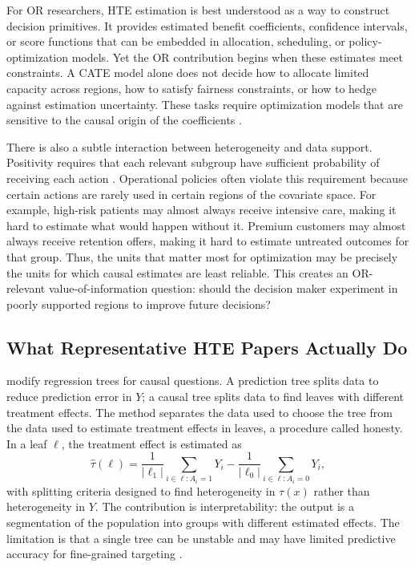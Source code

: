 \documentclass[11pt]{article}
\begin{document}
For OR researchers, HTE estimation is best understood as a way to construct decision primitives. It provides estimated benefit coefficients, confidence intervals, or score functions that can be embedded in allocation, scheduling, or policy-optimization models. Yet the OR contribution begins when these estimates meet constraints. A CATE model alone does not decide how to allocate limited capacity across regions, how to satisfy fairness constraints, or how to hedge against estimation uncertainty. These tasks require optimization models that are sensitive to the causal origin of the coefficients \citep{ben2009robust,athey2021policy}.

There is also a subtle interaction between heterogeneity and data support. Positivity requires that each relevant subgroup have sufficient probability of receiving each action \citep{imbens2015causal,hernan2020causal}. Operational policies often violate this requirement because certain actions are rarely used in certain regions of the covariate space. For example, high-risk patients may almost always receive intensive care, making it hard to estimate what would happen without it. Premium customers may almost always receive retention offers, making it hard to estimate untreated outcomes for that group. Thus, the units that matter most for optimization may be precisely the units for which causal estimates are least reliable. This creates an OR-relevant value-of-information question: should the decision maker experiment in poorly supported regions to improve future decisions?

\subsection{What Representative HTE Papers Actually Do}

\citet{athey2016recursive} modify regression trees for causal questions. A prediction tree splits data to reduce prediction error in $Y$; a causal tree splits data to find leaves with different treatment effects. The method separates the data used to choose the tree from the data used to estimate treatment effects in leaves, a procedure called honesty. In a leaf $\ell$, the treatment effect is estimated as
\[
    \hat{\tau}(\ell)
    =
    \frac{1}{|\ell_1|}\sum_{i\in \ell:A_i=1}Y_i
    -
    \frac{1}{|\ell_0|}\sum_{i\in \ell:A_i=0}Y_i,
\]
with splitting criteria designed to find heterogeneity in $\tau(x)$ rather than heterogeneity in $Y$. The contribution is interpretability: the output is a segmentation of the population into groups with different estimated effects. The limitation is that a single tree can be unstable and may have limited predictive accuracy for fine-grained targeting \citep{athey2016recursive}.
\end{document}
